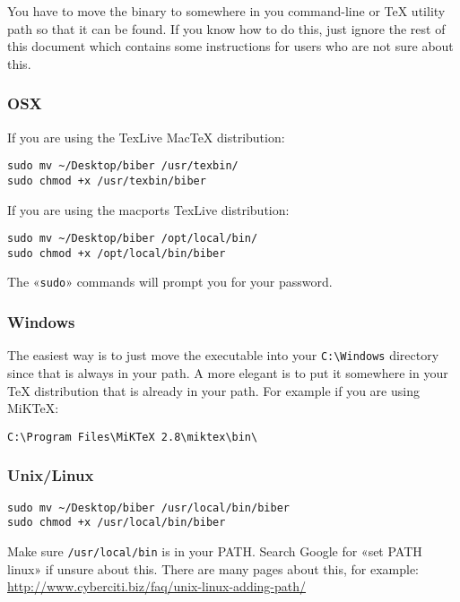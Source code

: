 \documentclass{ltxdockit}
\begin{document}
You have to move the binary to somewhere in you command-line or TeX utility
path so that it can be found. If you know how to do this, just ignore the
rest of this document which contains some instructions for users who are
not sure about this.

\subsubsection{OSX}

If you are using the TexLive MacTeX distribution:

\begin{verbatim}
sudo mv ~/Desktop/biber /usr/texbin/
sudo chmod +x /usr/texbin/biber
\end{verbatim}

\noindent If you are using the macports TexLive distribution:

\begin{verbatim}
sudo mv ~/Desktop/biber /opt/local/bin/
sudo chmod +x /opt/local/bin/biber
\end{verbatim}

\noindent The «\verb+sudo+» commands will prompt you for your password.

\subsubsection{Windows}

The easiest way is to just move the executable into your \verb+C:\Windows+ directory since
that is always in your path. A more elegant is to put it somewhere in
your TeX distribution that is already in your path. For example if you
are using MiKTeX:

\begin{verbatim}
C:\Program Files\MiKTeX 2.8\miktex\bin\
\end{verbatim}

\subsubsection{Unix/Linux}

\begin{verbatim}
sudo mv ~/Desktop/biber /usr/local/bin/biber
sudo chmod +x /usr/local/bin/biber
\end{verbatim}

\noindent Make sure \verb+/usr/local/bin+ is in your PATH. Search Google for «set PATH
linux» if unsure about this. There are many pages about this, for example:
\url{http://www.cyberciti.biz/faq/unix-linux-adding-path/}
\end{document}
